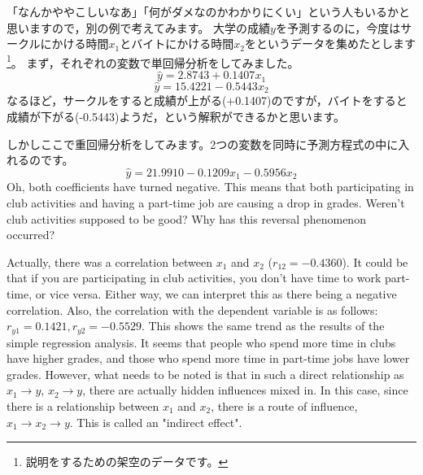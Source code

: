 \documentclass{ltjbook}
\begin{document}
「なんかややこしいなあ」「何がダメなのかわかりにくい」という人もいるかと思いますので，別の例で考えてみます。
大学の成績$y$を予測するのに，今度はサークルにかける時間$x_1$とバイトにかける時間$x_2$をというデータを集めたとします\footnote{説明をするための架空のデータです。}。
まず，それぞれの変数で単回帰分析をしてみました。
\[ \hat{y} = 2.8743 + 0.1407 x_1 \]
\[ \hat{y} = 15.4221 -0.5443 x_2 \]
なるほど，サークルをすると成績が上がる(+0.1407)のですが，バイトをすると成績が下がる(-0.5443)ようだ，という解釈ができるかと思います。

しかしここで重回帰分析をしてみます。2つの変数を同時に予測方程式の中に入れるのです。
\[\hat{y} = 21.9910 -0.1209 x_1 - 0.5956x_2\]
Oh, both coefficients have turned negative. This means that both participating in club activities and having a part-time job are causing a drop in grades. Weren't club activities supposed to be good? Why has this reversal phenomenon occurred?

Actually, there was a correlation between $x_1$ and $x_2$ ($r_{12}=-0.4360$). It could be that if you are participating in club activities, you don't have time to work part-time, or vice versa. Either way, we can interpret this as there being a negative correlation.
Also, the correlation with the dependent variable is as follows: $r_{y1}=0.1421,r_{y2}=-0.5529$. This shows the same trend as the results of the simple regression analysis. It seems that people who spend more time in clubs have higher grades, and those who spend more time in part-time jobs have lower grades.
However, what needs to be noted is that in such a direct relationship as $x_1 \to y$, $x_2 \to y$, there are actually hidden influences mixed in. In this case, since there is a relationship between $x_1$ and $x_2$, there is a route of influence, $x_1 \to x_2 \to y$. This is called an "indirect effect".
\end{document}
